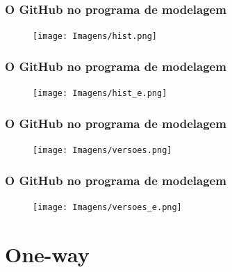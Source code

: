 \documentclass[10pt]{beamer} %
\begin{document}
\begin{frame}
\frametitle{O GitHub no programa de modelagem}

\begin{block}{}
\begin{figure}[H]
\centering
\texttt{[image: Imagens/hist.png]}
\end{figure}

\end{block}
\end{frame}

\begin{frame}
\frametitle{O GitHub no programa de modelagem}

\begin{block}{}
\begin{figure}[H]
\centering
\texttt{[image: Imagens/hist\_e.png]}
\end{figure}

\end{block}
\end{frame}

\begin{frame}
\frametitle{O GitHub no programa de modelagem}

\begin{block}{}
\begin{figure}[H]
\centering
\texttt{[image: Imagens/versoes.png]}
\end{figure}

\end{block}
\end{frame}

\begin{frame}
\frametitle{O GitHub no programa de modelagem}

\begin{block}{}
\begin{figure}[H]
\centering
\texttt{[image: Imagens/versoes\_e.png]}
\end{figure}

\end{block}
\end{frame}


\section{One-way}
\end{document}
